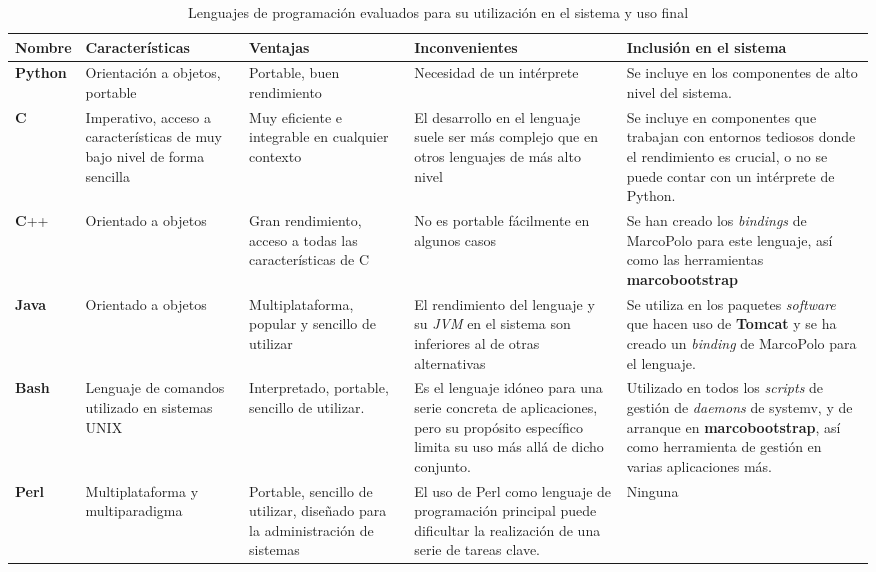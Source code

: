 \begin{landscape}
\begin{table}[H]
\begin{tabular}{|p{1.4cm}|p{3.7cm}|p{3.5cm}|p{5cm}|p{7.5cm}|}
\hline
\textbf{Nombre} & \textbf{Características} & \textbf{Ventajas} & \textbf{Inconvenientes} & \textbf{Inclusión en el sistema}\\ \hline

\textbf{Python} & Orientación a objetos, portable & Portable, buen rendimiento & Necesidad de un intérprete & Se incluye en los componentes de alto nivel del sistema.\\ \hline

\textbf{C} & Imperativo, acceso a características de muy bajo nivel de forma sencilla & Muy eficiente e integrable en cualquier contexto & El desarrollo en el lenguaje suele ser más complejo que en otros lenguajes de más alto nivel & Se incluye en componentes que trabajan con entornos tediosos donde el rendimiento es crucial, o no se puede contar con un intérprete de Python. \\ \hline

\textbf{C}++ & Orientado a objetos & Gran rendimiento, acceso a todas las características de C & No es portable fácilmente en algunos casos & Se han creado los \textit{bindings} de MarcoPolo para este lenguaje, así como las herramientas \textbf{marcobootstrap}\\ \hline

\textbf{Java} & Orientado a objetos & Multiplataforma, popular y sencillo de utilizar & El rendimiento del lenguaje y su \textit{JVM} en el sistema son inferiores al de otras alternativas & Se utiliza en los paquetes \textit{software} que hacen uso de \textbf{Tomcat} y se ha creado un \textit{binding} de MarcoPolo para el lenguaje.\\ \hline

\textbf{Bash} & Lenguaje de comandos utilizado en sistemas UNIX & Interpretado, portable, sencillo de utilizar. & Es el lenguaje idóneo para una serie  concreta de aplicaciones, pero su propósito específico limita su uso más allá de dicho conjunto. & Utilizado en todos los \textit{scripts} de gestión de \textit{daemons} de systemv, y de arranque en \textbf{marcobootstrap}, así como herramienta de gestión en varias aplicaciones más.\\ \hline

\textbf{Perl} & Multiplataforma y multiparadigma & Portable, sencillo de utilizar, diseñado para la administración de sistemas & El uso de Perl como lenguaje de programación principal puede dificultar la realización de una serie de tareas clave. & Ninguna\\ \hline
\end{tabular}
\caption[Lenguajes de programación evaluados]{Lenguajes de programación evaluados para su utilización en el sistema y uso final}
\end{table}
\end{landscape}

